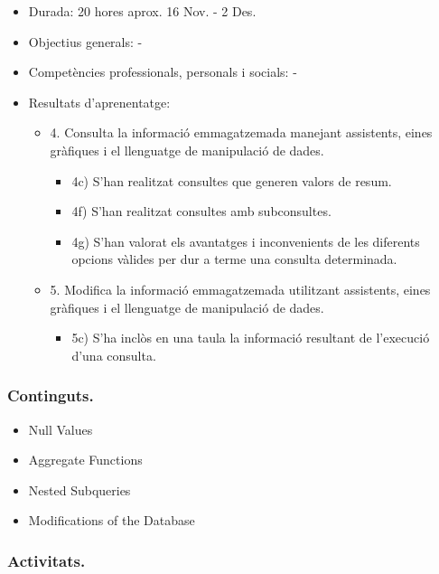 \documentclass[catalan, a4paper, 12pt, titlepage]{article}
\begin{document}
  \begin{itemize}
	\item Durada: 20 hores aprox. 16 Nov. - 2 Des.
	\item Objectius generals: -
	\item Competències professionals, personals i socials: -
	\item Resultats d'aprenentatge: 
		\begin{itemize}
			\item 4. Consulta la informació emmagatzemada manejant assistents, eines gràfiques i el llenguatge de manipulació de dades.
				\begin{itemize}
					\item 4c) S'han realitzat consultes que generen valors de resum.
					\item 4f) S'han realitzat consultes amb subconsultes.
					\item 4g) S'han valorat els avantatges i inconvenients de les diferents opcions vàlides per dur a terme una consulta determinada.
				\end{itemize}
			\item 5. Modifica la informació emmagatzemada utilitzant assistents, eines gràfiques i el llenguatge de manipulació de dades.
				\begin{itemize}
					\item 5c) S'ha inclòs en una taula la informació resultant de l'execució d'una consulta.
				\end{itemize}
		\end{itemize}
  \end{itemize}

  \subsubsection{Continguts.}
  \begin{itemize}
	  \item Null Values
	  \item Aggregate Functions 
	  \item Nested Subqueries
	  \item Modifications of the Database
  \end{itemize}
  
  \subsubsection{Activitats.}
\end{document}
